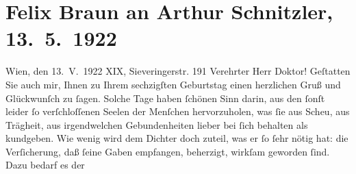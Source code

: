 

         
         \renewcommand{\erwaehntePersonen}{Personen: Felix Braun}
         \renewcommand{\erwaehnteOrte}{Orte: Sieveringer Straße, Wien}
         \renewcommand{\erwaehnteWerke}{}
               \section[Felix Braun an Arthur Schnitzler, 13. 5. 1922]{ Felix Braun an Arthur Schnitzler, 13. 5. 1922}\nopagebreak{}\rehead{ }\begin{ledgroupsized}[t]{13cm}\normalsize\beginnumbering{} \toendnotes[C]{\smallbreak\pagebreak[2]} 
\toendnotes[C]{\smallbreak}\pstart
           \raggedleft{}{\pb}Wien, den 13. V. 1922\pend
           \pstart
           \raggedleft{}XIX, Sieveringerstr. 191\pend
           \pstart{}Verehrter Herr Doktor!\pend\pstart
           Geſtatten Sie auch mir, Ihnen zu Ihrem sechzigſten Geburtstag einen herzlichen Gruß
               und Glückwunſch zu ſagen. Solche Tage haben \label{T_L02381-1v}\label{T_L02381-1h} ſchönen Sinn darin, aus den ſonſt
               leider ſo verſchloſſenen Seelen der Menſchen hervorzuholen, was ſie aus Scheu, aus
               Trägheit, aus irgendwelchen Gebundenheiten lieber bei ſich behalten als kundgeben.
               Wie wenig wird dem Dichter doch zuteil, was er ſo ſehr nötig hat: die Verſicherung,
               daß ſeine Gaben empfangen, beherzigt, wirkſam geworden ſind. Dazu bedarf es der

\end{ledgroupsized}

